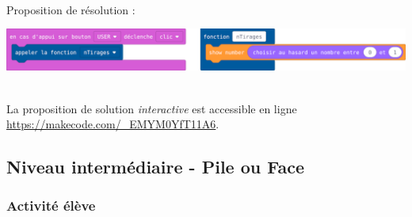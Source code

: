 \begin{minipage}{0.7\linewidth}
    \begin{methode}~\\
    Proposition de résolution :
    
    \centerline{\includegraphics[width=\linewidth]{res/st-pf-00-prof.png}}
    \end{methode}
\end{minipage}
\hfill
\begin{minipage}{0.3\linewidth}
    \begin{remarque}~\\
        La proposition de solution \emph{interactive} est accessible en ligne \url{https://makecode.com/_EMYM0YfT11A6}.
    \end{remarque}
\end{minipage}


%
%
\newpage
\subsection{Niveau intermédiaire - Pile ou Face}
\subsubsection{Activité élève}





